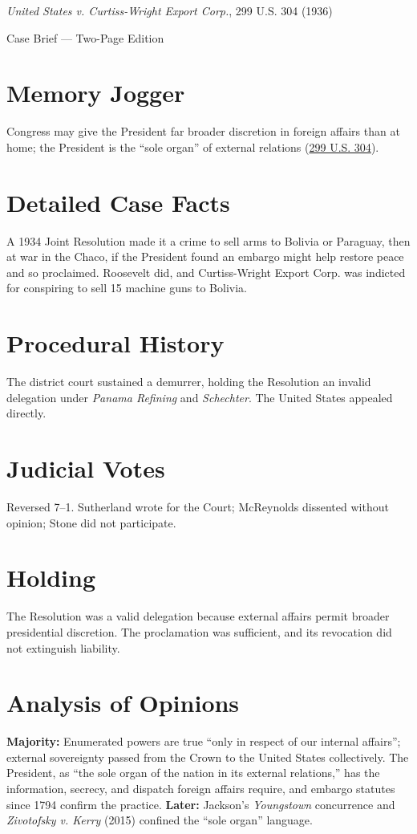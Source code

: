 \documentclass[12pt]{article}
\begin{document}
\begin{center}
{\LARGE \textit{United States v. Curtiss-Wright Export Corp.}, 299 U.S. 304 (1936)\par}
\vspace{0.5em}
{\large Case Brief --- Two-Page Edition\par}
\end{center}

\section{Memory Jogger}
Congress may give the President far broader discretion in foreign affairs than at home; the President is the ``sole organ'' of external relations (\href{https://supreme.justia.com/cases/federal/us/299/304/}{299 U.S. 304}).

\section{Detailed Case Facts}
A 1934 Joint Resolution made it a crime to sell arms to Bolivia or Paraguay, then at war in the Chaco, if the President found an embargo might help restore peace and so proclaimed. Roosevelt did, and Curtiss-Wright Export Corp. was indicted for conspiring to sell 15 machine guns to Bolivia.

\section{Procedural History}
The district court sustained a demurrer, holding the Resolution an invalid delegation under \textit{Panama Refining} and \textit{Schechter}. The United States appealed directly.

\section{Judicial Votes}
Reversed 7--1. Sutherland wrote for the Court; McReynolds dissented without opinion; Stone did not participate.

\section{Holding}
The Resolution was a valid delegation because external affairs permit broader presidential discretion. The proclamation was sufficient, and its revocation did not extinguish liability.

\section{Analysis of Opinions}
\textbf{Majority:} Enumerated powers are true ``only in respect of our internal affairs''; external sovereignty passed from the Crown to the United States collectively. The President, as ``the sole organ of the nation in its external relations,'' has the information, secrecy, and dispatch foreign affairs require, and embargo statutes since 1794 confirm the practice. \textbf{Later:} Jackson's \textit{Youngstown} concurrence and \textit{Zivotofsky v. Kerry} (2015) confined the ``sole organ'' language.
\end{document}
